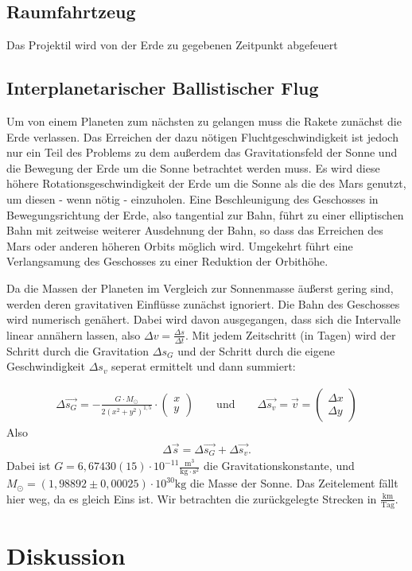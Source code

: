\documentclass{article}
\begin{document}
 
\subsection{Raumfahrtzeug}
Das Projektil wird von der Erde zu gegebenen Zeitpunkt abgefeuert
\subsection{Interplanetarischer Ballistischer Flug}
Um von einem Planeten zum nächsten zu gelangen muss die Rakete zunächst die Erde verlassen. Das Erreichen der dazu nötigen Fluchtgeschwindigkeit ist jedoch nur ein Teil des Problems zu dem außerdem das Gravitationsfeld der Sonne und die Bewegung der Erde um die Sonne betrachtet werden muss. Es wird diese höhere Rotationsgeschwindigkeit der Erde um die Sonne als die des Mars genutzt, um diesen - wenn nötig - einzuholen. Eine Beschleunigung des Geschosses in Bewegungsrichtung der Erde, also tangential zur Bahn, führt zu einer elliptischen Bahn mit zeitweise weiterer Ausdehnung der Bahn, so dass das Erreichen des Mars oder anderen höheren Orbits möglich wird. Umgekehrt führt eine Verlangsamung des Geschosses zu einer Reduktion der Orbithöhe. 

Da die Massen der Planeten im Vergleich zur Sonnenmasse äußerst gering sind, werden deren gravitativen Einflüsse zunächst ignoriert. Die Bahn des Geschosses wird numerisch genähert. Dabei wird davon ausgegangen, dass sich die Intervalle linear annähern lassen, also $\Delta v = \frac{\Delta s}{\Delta t}$. Mit jedem Zeitschritt (in Tagen) wird der Schritt durch die Gravitation $\Delta s_G$ und der Schritt durch die eigene Geschwindigkeit $\Delta s_v$ seperat ermittelt und dann summiert:

\begin{align*}
\Delta \vec{s_G} = -\frac{G \cdot M_{\odot}}{2(x^2 +y^2)^{1,5}} \cdot \begin{pmatrix}x \\ y\end{pmatrix} \qquad \text{und} \qquad
\Delta \vec{s_v} = \vec{v} = \begin{pmatrix} \Delta x \\ \Delta y \end{pmatrix}
\end{align*}
Also
\begin{align*}
\Delta \vec{s} = \Delta \vec{s_G} + \Delta \vec{s_v}.
\end{align*}
Dabei ist $G = 6,67430(15) \cdot 10^{-11} \frac{\text{m}^3}{\text{kg} \cdot \text{s}^2}$ die Gravitationskonstante, und $M_{\odot} = (1,98892 \pm 0,00025) \cdot 10^{30} \text{kg}$ die Masse der Sonne. Das Zeitelement fällt hier weg, da es gleich Eins ist. Wir betrachten die zurückgelegte Strecken in $\frac{\text{km}}{\text{Tag}}$.

\section{Diskussion}
\end{document}
